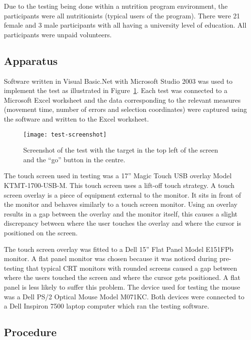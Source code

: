 \documentclass{elsart}
\begin{document}
Due to the testing being done within a nutrition program environment,
the participants were all nutritionists (typical users of the program).
There were 21 female and 3 male participants with all having a
university level of education. All participants were unpaid volunteers.

\subsection{Apparatus}
\label{sec-method-apparatus}

Software written in Visual Basic.Net with Microsoft Studio 2003 was used
to implement the test as illustrated in
Figure~\ref{fig-test-screenshot}. Each test was connected to a Microsoft
Excel worksheet and the data corresponding to the relevant measures
(movement time, number of errors and selection coordinates) were
captured using the software and written to the Excel worksheet.

\begin{figure}
	\texttt{[image: test-screenshot]}
	\caption{Screenshot of the test with the target in the top left of
	the screen and the ``go'' button in the centre.}
	\label{fig-test-screenshot}
\end{figure}

The touch screen used in testing was a 17'' Magic Touch USB overlay
Model KTMT-1700-USB-M. This touch screen uses a lift-off touch strategy.
A touch screen overlay is a piece of equipment external to the monitor.
It sits in front of the monitor and behaves similarly to a touch screen
monitor. Using an overlay results in a gap between the overlay and the
monitor itself, this causes a slight discrepancy between where the user
touches the overlay and where the cursor is positioned on the screen.

The touch screen overlay was fitted to a Dell 15'' Flat Panel Model
E151FPb monitor. A flat panel monitor was chosen because it was noticed
during pre-testing that typical CRT monitors with rounded screens caused
a gap between where the users touched the screen and where the cursor
gets positioned. A flat panel is less likely to suffer this problem. The
device used for testing the mouse was a Dell PS/2 Optical Mouse Model
M071KC. Both devices were connected to a Dell Inspiron 7500 laptop
computer which ran the testing software.

\subsection{Procedure}
\label{sec-method-procedure}
\end{document}

